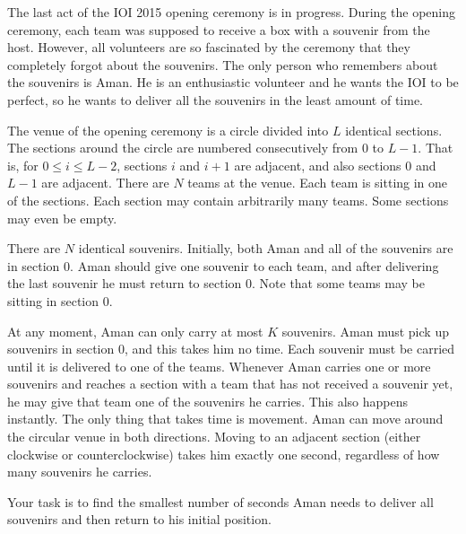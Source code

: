The last act of the IOI 2015 opening ceremony is in progress. During the opening ceremony, each team was supposed to receive a box with a souvenir from the host. However, all volunteers are so fascinated by the ceremony that they completely forgot about the souvenirs. The only person who remembers about the souvenirs is Aman. He is an enthusiastic volunteer and he wants the IOI to be perfect, so he wants to deliver all the souvenirs in the least amount of time.

The venue of the opening ceremony is a circle divided into $L$ identical sections. The sections around the circle are numbered consecutively from $0$ to $L - 1$. That is, for $0 \le i \le L - 2$, sections $i$ and $i + 1$ are adjacent, and also sections $0$ and $L - 1$ are adjacent. There are $N$ teams at the venue. Each team is sitting in one of the sections. Each section may contain arbitrarily many teams. Some sections may even be empty.

There are $N$ identical souvenirs. Initially, both Aman and all of the souvenirs are in section $0$. Aman should give one souvenir to each team, and after delivering the last souvenir he must return to section $0$. Note that some teams may be sitting in section $0$.

At any moment, Aman can only carry at most $K$ souvenirs. Aman must pick up souvenirs in section $0$, and this takes him no time. Each souvenir must
be carried until it is delivered to one of the teams. Whenever Aman carries one or more souvenirs and reaches a section with a team that has not received a souvenir yet, he may give that team one of the souvenirs he carries. This also happens instantly. The only thing that takes time is movement. Aman can move around the circular venue in both directions. Moving to an adjacent section (either clockwise or counterclockwise) takes him exactly one second, regardless of how many souvenirs he carries.

Your task is to find the smallest number of seconds Aman needs to deliver all souvenirs and then return to his initial position.

